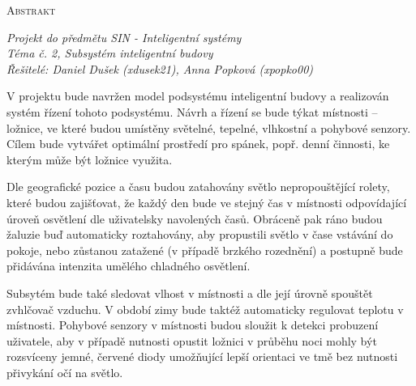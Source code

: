 \documentclass[a4paper,12pt]{article}
\renewcommand{\baselinestretch}{1.2}
\begin{document}
	

	\setlength{\parindent}{0pt}
	\vspace*{10pt}
	\LARGE \textsc{Abstrakt}
	\normalsize

	\vspace*{5pt}
	\textit{Projekt do předmětu SIN - Inteligentní systémy} \\
	\textit{Téma č. 2, Subsystém inteligentní budovy} \\
	\textit{Řešitelé: Daniel Dušek (xdusek21), Anna Popková (xpopko00)}

	\setlength{\parindent}{15pt}
	\setlength{\parskip}{15pt}
	\renewcommand{\baselinestretch}{1.5}
	\vspace*{15pt}
	V projektu bude navržen model podsystému inteligentní budovy a realizován systém řízení tohoto podsystému. Návrh a řízení se bude týkat místnosti -- ložnice, ve které budou umístěny světelné, tepelné, vlhkostní a pohybové senzory. Cílem bude vytvářet optimální prostředí pro spánek, popř. denní činnosti, ke kterým může být ložnice využita. 

	Dle geografické pozice a času budou zatahovány světlo nepropouštějící rolety, které budou zajišťovat, že každý den bude ve stejný čas v místnosti odpovídající úroveň osvětlení dle uživatelsky navolených časů. Obráceně pak ráno budou žaluzie buď automaticky roztahovány, aby propustili světlo v čase vstávání do pokoje, nebo zůstanou zatažené (v případě brzkého rozednění) a postupně bude přidávána intenzita umělého chladného osvětlení.

	Subsytém bude také sledovat vlhost v místnosti a dle její úrovně spouštět zvhlčovač vzduchu. V období zimy bude taktéž automaticky regulovat teplotu v místnosti. Pohybové senzory v místnosti budou sloužit k detekci probuzení uživatele, aby v případě nutnosti opustit ložnici v průběhu noci mohly být rozsvíceny jemné, červené diody umožňující lepší orientaci ve tmě bez nutnosti přivykání očí na světlo.
	
\end{document}
